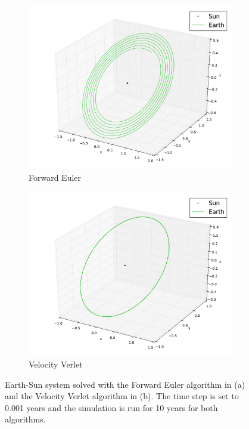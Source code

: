 \documentclass{article}
\begin{document}
\begin{figure}
\begin{subfigure}{0.5\textwidth}
\centering
\includegraphics[width=\linewidth]{fig/Two_Bodies_Forward_Euler.pdf}
\caption{Forward Euler}
\label{subfig:2body_euler}
\end{subfigure}
\begin{subfigure}{0.5\textwidth}
\centering
\includegraphics[width=\linewidth]{fig/Two_Bodies_Velocity_Verlet.pdf}
\caption{Velocity Verlet }
\label{subfig:2body_verlet}
\end{subfigure}
\caption{Earth-Sun system solved with the Forward Euler algorithm in (a) and the Velocity Verlet algorithm in (b). The time step is set to 0.001 years and the simulation is run for 10 years for both algorithms.}
\label{fig:2body}
\end{figure}
\end{document}
